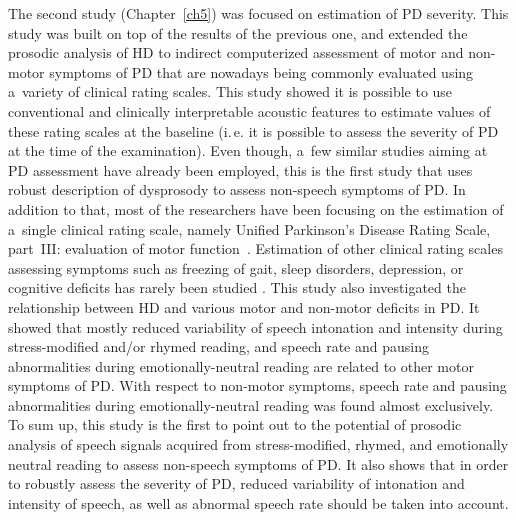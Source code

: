 The second study (Chapter~\ref{ch5}) was focused on estimation of PD severity. This study was built on top of the results of the previous one, and extended the prosodic analysis of HD to indirect computerized assessment of motor and non-motor symptoms of PD that are nowadays being commonly evaluated using a~variety of clinical rating scales. This study showed it is possible to use conventional and clinically interpretable acoustic features to estimate values of these rating scales at the baseline (i.\,e. it is possible to assess the severity of PD at the time of the examination). Even though, a~few similar studies aiming at PD assessment have already been employed, this is the first study that uses robust description of dysprosody to assess non-speech symptoms of PD. In addition to that, most of the researchers \cite{Asgari2010, Bayestehtashk2015, Eskidere2012, Peterek2013, Tsanas2010, Tsanas2010a, Tsanas2010b} have been focusing on the estimation of a~single clinical rating scale, namely Unified Parkinson's Disease Rating Scale, part~III: evaluation of motor function~\cite{Fahn1987}. Estimation of other clinical rating scales assessing symptoms such as freezing of gait, sleep disorders, depression, or cognitive deficits has rarely been studied \cite{Mekyska2015, Rektorova2016}. This study also investigated the relationship between HD and various motor and non-motor deficits in PD. It showed that mostly reduced variability of speech intonation and intensity during stress-modified and/or rhymed reading, and speech rate and pausing abnormalities during emotionally-neutral reading are related to other motor symptoms of PD. With respect to non-motor symptoms, speech rate and pausing abnormalities during emotionally-neutral reading was found almost exclusively. To sum up, this study is the first to point out to the potential of prosodic analysis of speech signals acquired from stress-modified, rhymed, and emotionally neutral reading to assess non-speech symptoms of PD. It also shows that in order to robustly assess the severity of PD, reduced variability of intonation and intensity of speech, as well as abnormal speech rate should be taken into account.

